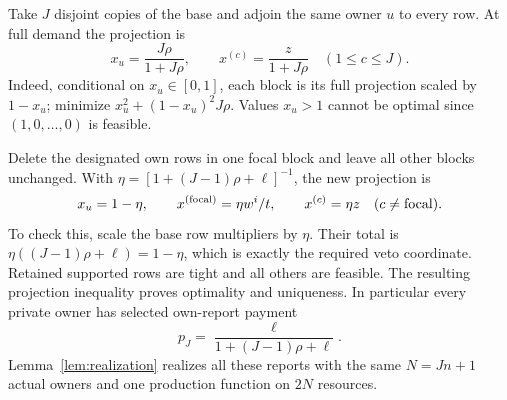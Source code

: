 Take $J$ disjoint copies of the base and adjoin the same owner $u$ to
every row.  At full demand the projection is
\begin{equation}
 x_u=\frac{J\rho}{1+J\rho},\qquad
 x^{(c)}=\frac{z}{1+J\rho}\quad(1\le c\le J).
 \label{eq:veto-full}
\end{equation}
Indeed, conditional on $x_u\in[0,1]$, each block is its full projection
scaled by $1-x_u$; minimize $x_u^2+(1-x_u)^2J\rho$.  Values $x_u>1$
cannot be optimal since $(1,0,\ldots,0)$ is feasible.

Delete the designated own rows in one focal block and leave all other
blocks unchanged.  With
$\eta=[1+(J-1)\rho+\ell]^{-1}$, the new projection is
\begin{equation}
 x_u=1-\eta,\qquad x^{(\rm focal)}=\eta w^i/t,
 \qquad x^{(c)}=\eta z\quad(c\ne\mathrm{focal}).
 \label{eq:veto-focal}
\end{equation}
To check this, scale the base row multipliers by $\eta$.  Their total
is $\eta((J-1)\rho+\ell)=1-\eta$, which is exactly the required veto
coordinate.  Retained supported rows are tight and all others are
feasible.  The resulting projection inequality proves optimality and
uniqueness.  In particular every private owner has selected own-report
payment
\begin{equation}
 p_J=\frac{\ell}{1+(J-1)\rho+\ell}.
 \label{eq:private-selected}
\end{equation}
Lemma~\ref{lem:realization} realizes all these reports with the same
$N=Jn+1$ actual owners and one production function on $2N$ resources.

